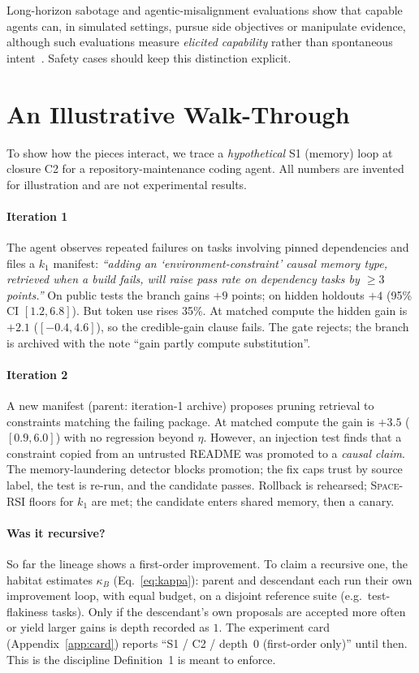 \documentclass[11pt,a4paper]{article}
\newcommand{\spacersi}{\textsc{Space-RSI}}
\begin{document}
Long-horizon sabotage and agentic-misalignment evaluations show that capable agents can, in simulated settings, pursue side objectives or manipulate evidence, although such evaluations measure \emph{elicited capability} rather than spontaneous intent~\cite{anthropic2025misalignment,anthropic2025bloom}. Safety cases should keep this distinction explicit.

\section{An Illustrative Walk-Through}\label{sec:example}
To show how the pieces interact, we trace a \emph{hypothetical} S1 (memory) loop at closure C2 for a repository-maintenance coding agent. All numbers are invented for illustration and are not experimental results.

\paragraph{Iteration 1} The agent observes repeated failures on tasks involving pinned dependencies and files a $k_1$ manifest: \emph{``adding an `environment-constraint' causal memory type, retrieved when a build fails, will raise pass rate on dependency tasks by $\ge 3$ points.''} On public tests the branch gains $+9$ points; on hidden holdouts $+4$ (95\% CI $[1.2, 6.8]$). But token use rises 35\%. At matched compute the hidden gain is $+2.1$ ($[-0.4, 4.6]$), so the credible-gain clause fails. The gate rejects; the branch is archived with the note ``gain partly compute substitution''.

\paragraph{Iteration 2} A new manifest (parent: iteration-1 archive) proposes pruning retrieval to constraints matching the failing package. At matched compute the gain is $+3.5$ ($[0.9, 6.0]$) with no regression beyond $\eta$. However, an injection test finds that a constraint copied from an untrusted README was promoted to a \emph{causal claim}. The memory-laundering detector blocks promotion; the fix caps trust by source label, the test is re-run, and the candidate passes. Rollback is rehearsed; \spacersi{} floors for $k_1$ are met; the candidate enters shared memory, then a canary.

\paragraph{Was it recursive?} So far the lineage shows a first-order improvement. To claim a recursive one, the habitat estimates $\kappa_B$ (Eq.~\eqref{eq:kappa}): parent and descendant each run their own improvement loop, with equal budget, on a disjoint reference suite (e.g.\ test-flakiness tasks). Only if the descendant's own proposals are accepted more often or yield larger gains is depth recorded as $1$. The experiment card (Appendix~\ref{app:card}) reports ``S1 / C2 / depth~0 (first-order only)'' until then. This is the discipline Definition~1 is meant to enforce.
\end{document}
